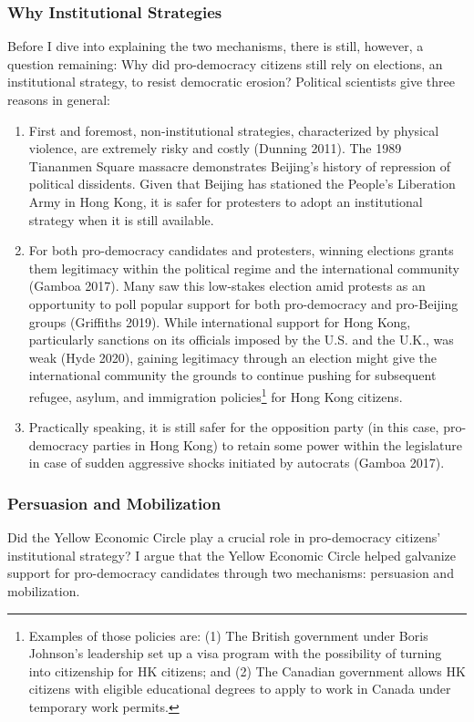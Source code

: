 \documentclass[letterpaper, 12pt]{article}
\begin{document}
\subsubsection{Why Institutional Strategies}
Before I dive into explaining the two mechanisms, there is still, however, a question remaining: Why did pro-democracy citizens still rely on elections, an institutional strategy, to resist democratic erosion? Political scientists give three reasons in general:
\begin{enumerate}
    \item First and foremost, non-institutional strategies, characterized by physical violence, are extremely risky and costly (Dunning 2011). The 1989 Tiananmen Square massacre demonstrates Beijing's history of repression of political dissidents. Given that Beijing has stationed the People's Liberation Army in Hong Kong, it is safer for protesters to adopt an institutional strategy when it is still available.
    
    \item For both pro-democracy candidates and protesters, winning elections grants them legitimacy within the political regime and the international community (Gamboa 2017). Many saw this low-stakes election amid protests as an opportunity to poll popular support for both pro-democracy and pro-Beijing groups (Griffiths 2019). While international support for Hong Kong, particularly sanctions on its officials imposed by the U.S. and the U.K., was weak (Hyde 2020), gaining legitimacy through an election might give the international community the grounds to continue pushing for subsequent refugee, asylum, and immigration policies\footnote{Examples of those policies are: (1) The British government under Boris Johnson's leadership set up a visa program with the possibility of turning into citizenship for HK citizens; and (2) The Canadian government allows HK citizens with eligible educational degrees to apply to work in Canada under temporary work permits.} for Hong Kong citizens.
    
    \item Practically speaking, it is still safer for the opposition party (in this case, pro-democracy parties in Hong Kong) to retain some power within the legislature in case of sudden aggressive shocks initiated by autocrats (Gamboa 2017).
\end{enumerate}


\subsubsection{Persuasion and Mobilization}
Did the Yellow Economic Circle play a crucial role in pro-democracy citizens' institutional strategy? I argue that the Yellow Economic Circle helped galvanize support for pro-democracy candidates through two mechanisms: persuasion and mobilization.
\end{document}
